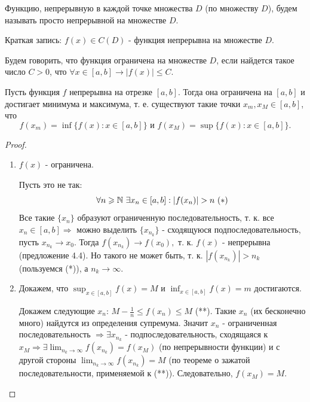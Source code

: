 	\begin{definition}
		Функцию, непрерывную в каждой точке множества $D$ (по множеству $D$), будем называть просто непрерывной на множестве $D$.
		
		Краткая запись: $f(x) \in C(D)$ - функция непрерывна на множестве $D$.
	\end{definition}
	
	\begin{definition}
		Будем говорить, что функция ограничена на множестве $D$, если найдется такое число $C > 0$, что $\forall x \in [a, b] \rightarrow |f(x)| \leqslant C$.
	\end{definition}
	
	\begin{theorem}[Вейерштрасс]
		Пусть функция $f$ непрерывна на отрезке $[a, b]$. Тогда она ограничена на $[a, b]$ и достигает минимума и максимума, т. е. существуют такие точки $x_m, x_M \in [a, b]$, что
		\[ f(x_m) = \inf\{f(x) : x \in [a, b]\} \text{ и } f(x_M) = \sup\{f(x) : x \in [a, b]\}. \]
	\end{theorem}
	
	\begin{proof}
		\begin{enumerate}
			\item $f(x)$ - ограничена.
			
			Пусть это не так:
			\[ \forall n \geqslant \mathbb N \text{ } \exists x_n \in [a, b]: |f(x_n)| > n \text{ } (*) \]
			Все такие $\{x_n\}$ образуют ограниченную последовательность, т. к. все $x_n \in [a, b] \Rightarrow$ можно выделить $\{x_{n_k}\}$ - сходящуюся подпоследовательность, пусть $x_{n_k} \to x_0.$ Тогда $f(x_{n_k}) \to f(x_0),$ т. к. $f(x)$ - непрерывна (предложение 4.4). Но такого не может быть, т. к. $|f(x_{n_k})| > n_k$ (пользуемся (*)), а $n_k \to \infty$.
			\item Докажем, что $\sup_{x \in [a, b]} f(x) = M$ и $\inf_{x \in [a, b]} f(x) = m$ достигаются.
			
			Докажем следующие $x_n$: $M - \frac{1}{n} \leqslant f(x_n) \leqslant M$ (**). Такие $x_n$ (их бесконечно много) найдутся из определения супремума. Значит $x_n$ - ограниченная последовательность $\Rightarrow \exists x_{n_k}$ - подпоследовательность, сходящаяся к $x_M \Rightarrow \exists \lim_{n_k \to \infty} f(x_{n_k}) = f(x_M)$ (по непрерывности функции) и с другой стороны $\lim_{n_k \to \infty} f(x_{n_k}) = M$ (по теореме о зажатой последовательности, применяемой к (**)). Следовательно, $f(x_M) = M$.  
		\end{enumerate}
	\end{proof}
	
